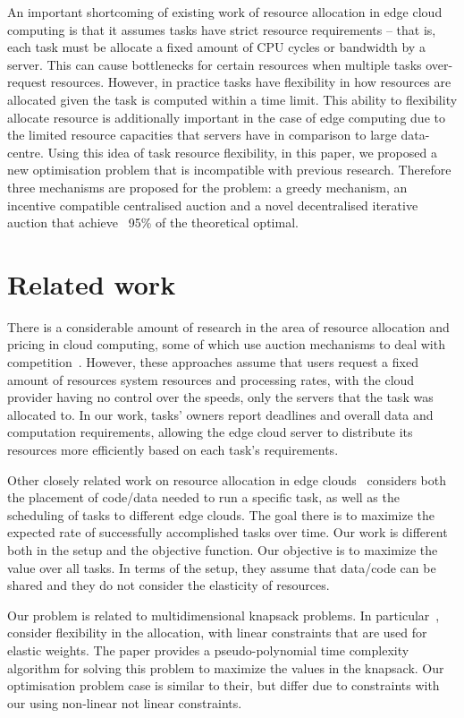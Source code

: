 An important shortcoming of existing work of resource allocation in edge cloud computing is that it assumes tasks have
strict resource requirements -- that is, each task must be allocate a fixed amount of CPU cycles or bandwidth by a
server. This can cause bottlenecks for certain resources when multiple tasks over-request resources. However, in
practice tasks have flexibility in how resources are allocated given the task is computed within a time limit. This
ability to flexibility allocate resource is additionally important in the case of edge computing due to the limited
resource capacities that servers have in comparison to large data-centre. Using this idea of task resource flexibility,
in this paper, we proposed a new optimisation problem that is incompatible with previous research. Therefore three
mechanisms are proposed for the problem: a greedy mechanism, an incentive compatible centralised auction and a novel
decentralised iterative auction that achieve ~95\% of the theoretical optimal.



\section{Related work}\label{sec:related-work}
There is a considerable amount of research in the area of resource allocation and pricing in cloud computing, some of
which use auction mechanisms to deal with competition~\cite{KUMAR2017234,Zhang2017,Du2019,Bi2019}.
However, these approaches assume that users request a fixed amount of resources system resources and processing rates,
with the cloud provider having no control over the speeds, only the servers that the task was allocated to. In our
work, tasks' owners report deadlines and overall data and computation requirements, allowing the edge cloud server to
distribute its resources more efficiently based on each task's requirements.

Other closely related work on resource allocation in edge clouds~\cite{vaji_infocom} considers both the placement of
code/data needed to run a specific task, as well as the scheduling of tasks to different edge clouds. The goal there is
to maximize the expected rate of successfully accomplished tasks over time. Our work is different both in the setup and
the objective function. Our objective is to maximize the value over all tasks. In terms of the setup, they assume that
data/code can be shared and they do not consider the elasticity of resources.

Our problem is related to multidimensional knapsack problems. In particular~\cite{Nip2017}, consider flexibility in
the allocation, with linear constraints that are used for elastic weights. The paper provides a pseudo-polynomial time
complexity algorithm for solving this problem to maximize the values in the knapsack. Our optimisation problem case is
similar to their, but differ due to constraints with our using non-linear not linear constraints.